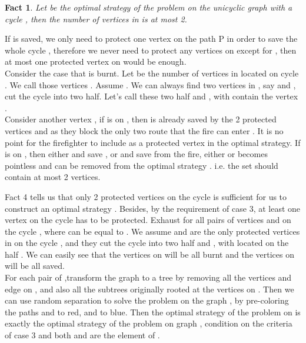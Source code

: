 \documentclass[11pt,letter]{article}
\newtheorem{Fact}{Fact}
\newenvironment{proof}{\noindent {\textbf{Proof }}}{ \medskip}
\begin{document}
\begin{Fact}
Let  be the optimal strategy of the problem on the unicyclic graph  with a cycle , then the number of vertices in  is at most 2.
\end{Fact}

\begin{proof}
If  is saved, we only need to protect one vertex on the path P in order to save the whole cycle , therefore we never need to protect any vertices on  except for , then at most one protected vertex on  would be enough.\\

Consider the case that  is burnt. Let  be the number of vertices in  located on cycle . We call those vertices . Assume . We can always find two vertices in , say  and , cut the cycle  into two half. Let's call these two half  and , with  contain the vertex . \\

Consider another vertex , if  is on , then  is already saved by the 2 protected vertices  and  as they block the only two route that the fire can enter . It is no point for the firefighter to include  as a protected vertex in the optimal strategy. If  is on , then either  and  save , or  and  save  from the fire, either  or  becomes pointless and can be removed from the optimal strategy . i.e. the set  should contain at most 2 vertices.
\end{proof}

Fact 4 tells us that only 2 protected vertices on the cycle  is sufficient for us to construct an optimal strategy . Besides, by the requirement of case 3, at least one vertex on the cycle  has to be protected. Exhaust for all pairs of vertices  and  on the cycle , where  can be equal to . We assume  and  are the only protected vertices in  on the cycle , and they cut the cycle  into two half  and , with  located on the half . We can easily see that the vertices on  will be all burnt and the vertices on  will be all saved. \\

For each pair of ,transform the graph  to a tree  by removing all the vertices and edge on , and also all the subtrees originally rooted at the vertices on . Then we can use random separation to solve the problem on the graph , by pre-coloring the paths  and  to red, and  to blue. Then the optimal strategy  of the problem on  is exactly the optimal strategy of the problem on graph , condition on the criteria of case 3 and both  and  are the element of .\\
 
\end{document}
